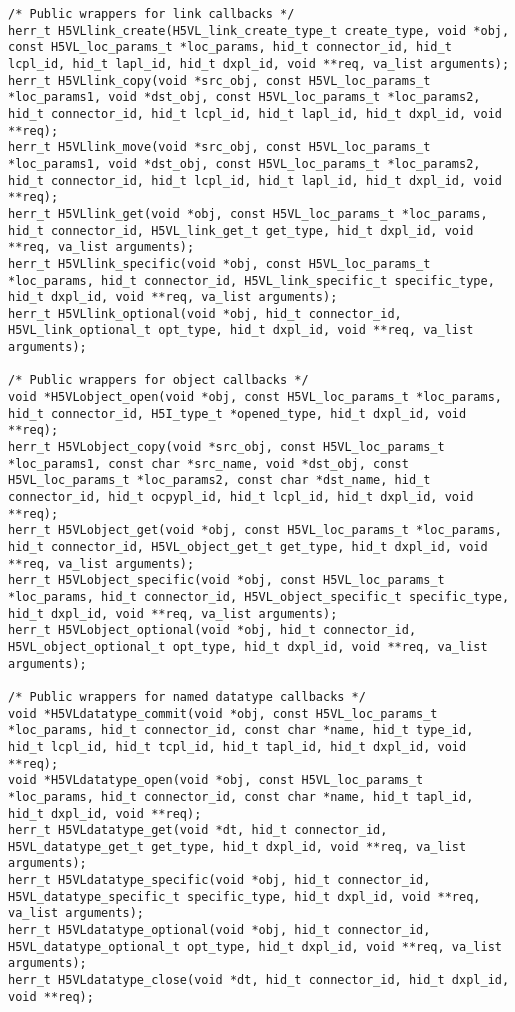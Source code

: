 \begin{appendices}
\begin{lstlisting}
/* Public wrappers for link callbacks */
herr_t H5VLlink_create(H5VL_link_create_type_t create_type, void *obj, const H5VL_loc_params_t *loc_params, hid_t connector_id, hid_t lcpl_id, hid_t lapl_id, hid_t dxpl_id, void **req, va_list arguments);
herr_t H5VLlink_copy(void *src_obj, const H5VL_loc_params_t *loc_params1, void *dst_obj, const H5VL_loc_params_t *loc_params2, hid_t connector_id, hid_t lcpl_id, hid_t lapl_id, hid_t dxpl_id, void **req);
herr_t H5VLlink_move(void *src_obj, const H5VL_loc_params_t *loc_params1, void *dst_obj, const H5VL_loc_params_t *loc_params2, hid_t connector_id, hid_t lcpl_id, hid_t lapl_id, hid_t dxpl_id, void **req);
herr_t H5VLlink_get(void *obj, const H5VL_loc_params_t *loc_params, hid_t connector_id, H5VL_link_get_t get_type, hid_t dxpl_id, void **req, va_list arguments);
herr_t H5VLlink_specific(void *obj, const H5VL_loc_params_t *loc_params, hid_t connector_id, H5VL_link_specific_t specific_type, hid_t dxpl_id, void **req, va_list arguments);
herr_t H5VLlink_optional(void *obj, hid_t connector_id, H5VL_link_optional_t opt_type, hid_t dxpl_id, void **req, va_list arguments);

/* Public wrappers for object callbacks */
void *H5VLobject_open(void *obj, const H5VL_loc_params_t *loc_params, hid_t connector_id, H5I_type_t *opened_type, hid_t dxpl_id, void **req);
herr_t H5VLobject_copy(void *src_obj, const H5VL_loc_params_t *loc_params1, const char *src_name, void *dst_obj, const H5VL_loc_params_t *loc_params2, const char *dst_name, hid_t connector_id, hid_t ocpypl_id, hid_t lcpl_id, hid_t dxpl_id, void **req);
herr_t H5VLobject_get(void *obj, const H5VL_loc_params_t *loc_params, hid_t connector_id, H5VL_object_get_t get_type, hid_t dxpl_id, void **req, va_list arguments);
herr_t H5VLobject_specific(void *obj, const H5VL_loc_params_t *loc_params, hid_t connector_id, H5VL_object_specific_t specific_type, hid_t dxpl_id, void **req, va_list arguments);
herr_t H5VLobject_optional(void *obj, hid_t connector_id, H5VL_object_optional_t opt_type, hid_t dxpl_id, void **req, va_list arguments);

/* Public wrappers for named datatype callbacks */                               
void *H5VLdatatype_commit(void *obj, const H5VL_loc_params_t *loc_params, hid_t connector_id, const char *name, hid_t type_id, hid_t lcpl_id, hid_t tcpl_id, hid_t tapl_id, hid_t dxpl_id, void **req);
void *H5VLdatatype_open(void *obj, const H5VL_loc_params_t *loc_params, hid_t connector_id, const char *name, hid_t tapl_id, hid_t dxpl_id, void **req);
herr_t H5VLdatatype_get(void *dt, hid_t connector_id, H5VL_datatype_get_t get_type, hid_t dxpl_id, void **req, va_list arguments);
herr_t H5VLdatatype_specific(void *obj, hid_t connector_id, H5VL_datatype_specific_t specific_type, hid_t dxpl_id, void **req, va_list arguments);
herr_t H5VLdatatype_optional(void *obj, hid_t connector_id, H5VL_datatype_optional_t opt_type, hid_t dxpl_id, void **req, va_list arguments);
herr_t H5VLdatatype_close(void *dt, hid_t connector_id, hid_t dxpl_id, void **req);


\end{lstlisting}
\end{appendices}
